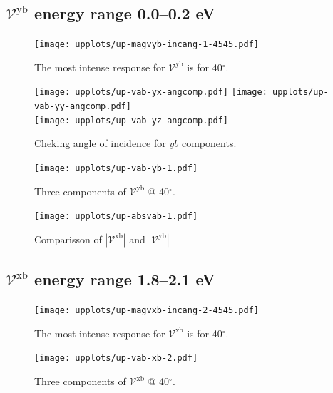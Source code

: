 \documentclass{article}
\let\Oldsubsection\subsection
\renewcommand{\subsection}{\FloatBarrier\Oldsubsection}
\begin{document}

\subsection{$\mathcal{V}^{\mathrm{yb}}$ energy range 0.0--0.2 eV }
\begin{figure}[h]
    \centering
    \texttt{[image: upplots/up-magvyb-incang-1-4545.pdf]}
    \caption{The most intense response for $\mathcal{V}^{\mathrm{yb}} $ is for 
    40$^{\circ}$.}
    \label{fig:up-magvybincang1}
\end{figure}
\begin{figure}[ht]
    \centering
    \texttt{[image: upplots/up-vab-yx-angcomp.pdf]}
    \texttt{[image: upplots/up-vab-yy-angcomp.pdf]}\\
    \texttt{[image: upplots/up-vab-yz-angcomp.pdf]}
    \caption{Cheking angle of incidence for $yb$ components.}
    \label{fig:up-ybangcomp}
\end{figure}
\begin{figure}[ht]
    \centering
    \texttt{[image: upplots/up-vab-yb-1.pdf]}
    \caption{Three components of $\mathcal{V}^{\mathrm{yb}} $ @ 40$^{\circ}$.}
    \label{fig:up-vyb1}
\end{figure}

\begin{figure}[ht]
    \centering
    \texttt{[image: upplots/up-absvab-1.pdf]}
    \caption{Comparisson of $|\mathcal{V}^{\mathrm{xb}}|$ and $|\mathcal{V}^{\mathrm{yb}}|$}    
    \label{fig:up-xbybcomp-1}
\end{figure}


\subsection{$\mathcal{V}^{\mathrm{xb}}$ energy range 1.8--2.1 eV }


\begin{figure}[h]
    \centering
    \texttt{[image: upplots/up-magvxb-incang-2-4545.pdf]}
    \caption{The most intense response for $\mathcal{V}^{\mathrm{xb}} $ is for 
    40$^{\circ}$.}
    \label{fig:up-magxbincang2}
\end{figure}
\begin{figure}[h]
    \centering
    \texttt{[image: upplots/up-vab-xb-2.pdf]}
    \caption{Three components of $\mathcal{V}^{\mathrm{xb}} $ @ 40$^{\circ}$.}
    \label{fig:up-vxb2}
\end{figure}
\end{document}
